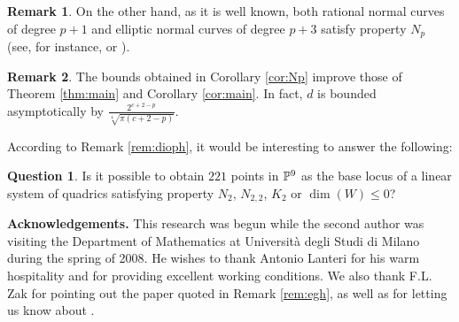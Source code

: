 \documentclass{amsart}
\theoremstyle{definition}
\newtheorem{remark}{Remark}
\newtheorem{question}{Question}
\begin{document}
\begin{remark}
On the other hand, as it is well known, both rational normal curves
of degree $p+1$ and elliptic normal curves of degree $p+3$ satisfy
property $N_p$ (see, for instance, \cite{g} or \cite{gl}).
\end{remark}

\begin{remark}
The bounds obtained in Corollary \ref{cor:Np} improve those of
Theorem \ref{thm:main} and Corollary \ref{cor:main}. In fact, $d$ is
bounded asymptotically by $\frac{2^{c+2-p}}{\sqrt[4]{\pi(c+2-p)}}$.
\end{remark}

According to Remark \ref{rem:dioph}, it would be interesting to
answer the following:

\begin{question}
Is it possible to obtain $221$ points in $\Bbb{P}^{9}$ as the base
locus of a linear system of quadrics satisfying property $N_2$,
$N_{2,2}$, $K_2$ or $\dim(W)\leq 0$?
\end{question}

\textbf{Acknowledgements.} This research was begun while the second
author was visiting the Department of Mathematics at Universit\`a
degli Studi di Milano during the spring of 2008. He wishes to thank
Antonio Lanteri for his warm hospitality and for providing excellent
working conditions. We also thank F.L. Zak for pointing out the
paper \cite{e-g-h} quoted in Remark \ref{rem:egh}, as well as for
letting us know about \cite{h-k}.
\end{document}
